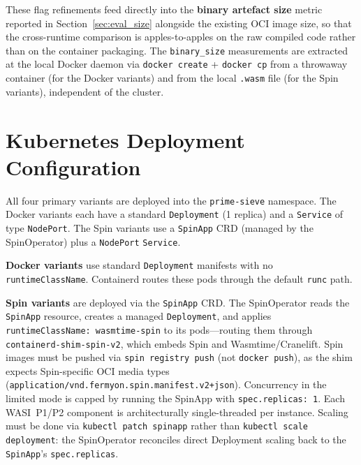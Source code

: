 \begin{sloppypar}
These flag refinements feed directly into the \textbf{binary artefact size} metric reported in Section~\ref{sec:eval_size} alongside the existing \acs{OCI} image size, so that the cross-runtime comparison is apples-to-apples on the raw compiled code rather than on the container packaging. The \texttt{binary\_size} measurements are extracted at the local Docker daemon via \texttt{docker~create} + \texttt{docker~cp} from a throwaway container (for the Docker variants) and from the local \texttt{.wasm} file (for the Spin variants), independent of the cluster.
\end{sloppypar}

\section{Kubernetes Deployment Configuration}
\label{sec:k8s_deployment}

\begin{sloppypar}
All four primary variants are deployed into the \texttt{prime-sieve} namespace. The Docker variants each have a standard \texttt{Deployment} (1 replica) and a \texttt{Service} of type \texttt{NodePort}. The Spin variants use a \texttt{SpinApp} \acs{CRD} (managed by the SpinOperator) plus a \texttt{NodePort} \texttt{Service}.
\end{sloppypar}

\begin{sloppypar}
\textbf{Docker variants} use standard \texttt{Deployment} manifests with no \texttt{runtimeClassName}. Containerd routes these pods through the default \texttt{runc} path.
\end{sloppypar}

\begin{sloppypar}
\textbf{Spin variants} are deployed via the \texttt{SpinApp} \acs{CRD}. The SpinOperator reads the \texttt{SpinApp} resource, creates a managed \texttt{Deployment}, and applies \texttt{runtimeClassName: wasmtime-spin} to its pods---routing them through \texttt{containerd-shim-spin-v2}, which embeds Spin and Wasmtime/Cranelift. Spin images must be pushed via \texttt{spin registry push} (not \texttt{docker push}), as the shim expects Spin-specific \acs{OCI} media types (\texttt{application/vnd.fermyon.spin.manifest.v2+json}). Concurrency in the limited mode is capped by running the SpinApp with \texttt{spec.replicas:~1}. Each \acs{WASI}~P1/P2 component is architecturally single-threaded per instance. Scaling must be done via \texttt{kubectl patch spinapp} rather than \texttt{kubectl scale deployment}: the SpinOperator reconciles direct Deployment scaling back to the \texttt{SpinApp}'s \texttt{spec.replicas}.
\end{sloppypar}

